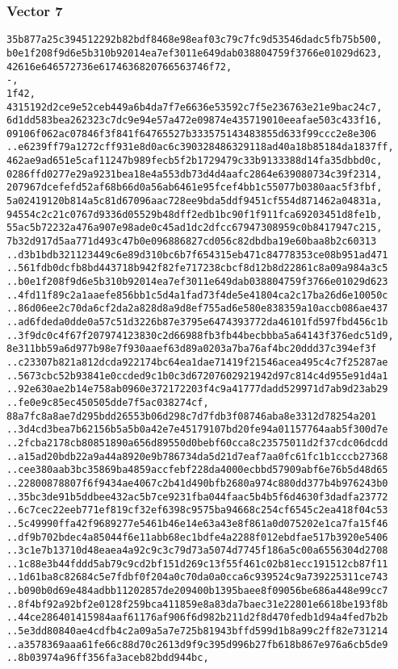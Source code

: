 \documentclass[
]{article}
\begin{document}
\hypertarget{vector-7-2}{%
\subsubsection{Vector 7}\label{vector-7-2}}

\begin{verbatim}
35b877a25c394512292b82bdf8468e98eaf03c79c7fc9d53546dadc5fb75b500,
b0e1f208f9d6e5b310b92014ea7ef3011e649dab038804759f3766e01029d623,
42616e646572736e6174636820766563746f72,
-,
1f42,
4315192d2ce9e52ceb449a6b4da7f7e6636e53592c7f5e236763e21e9bac24c7,
6d1dd583bea262323c7dc9e94e57a472e09874e435719010eeafae503c433f16,
09106f062ac07846f3f841f64765527b333575143483855d633f99ccc2e8e306
..e6239ff79a1272cff931e8d0ac6c390328486329118ad40a18b85184da1837ff,
462ae9ad651e5caf11247b989fecb5f2b1729479c33b9133388d14fa35dbbd0c,
0286ffd0277e29a9231bea18e4a553db73d4d4aafc2864e639080734c39f2314,
207967dcefefd52af68b66d0a56ab6461e95fcef4bb1c55077b0380aac5f3fbf,
5a02419120b814a5c81d67096aac728ee9bda5ddf9451cf554d871462a04831a,
94554c2c21c0767d9336d05529b48dff2edb1bc90f1f911fca69203451d8fe1b,
55ac5b72232a476a907e98ade0c45ad1dc2dfcc67947308959c0b8417947c215,
7b32d917d5aa771d493c47b0e096886827cd056c82dbdba19e60baa8b2c60313
..d3b1bdb321123449c6e89d310bc6b7f654315eb471c84778353ce08b951ad471
..561fdb0dcfb8bd443718b942f82fe717238cbcf8d12b8d22861c8a09a984a3c5
..b0e1f208f9d6e5b310b92014ea7ef3011e649dab038804759f3766e01029d623
..4fd11f89c2a1aaefe856bb1c5d4a1fad73f4de5e41804ca2c17ba26d6e10050c
..86d06ee2c70da6cf2da2a828d8a9d8ef755ad6e580e838359a10accb086ae437
..ad6fdeda0dde0a57c51d3226b87e3795e6474393772da46101fd597fbd456c1b
..3f9dc0c4f67f207974123830c2d66988fb3fb44becbbba5a64143f376edc51d9,
8e311bb59a6d977b98e7f930aaef63d89a0203a7ba76af4bc20ddd37c394ef3f
..c23307b821a812dcda922174bc64ea1dae71419f21546acea495c4c7f25287ae
..5673cbc52b93841e0ccded9c1b0c3d67207602921942d97c814c4d955e91d4a1
..92e630ae2b14e758ab0960e372172203f4c9a41777dadd529971d7ab9d23ab29
..fe0e9c85ec450505dde7f5ac038274cf,
88a7fc8a8ae7d295bdd26553b06d298c7d7fdb3f08746aba8e3312d78254a201
..3d4cd3bea7b62156b5a5b0a42e7e45179107bd20fe94a01157764aab5f300d7e
..2fcba2178cb80851890a656d89550d0bebf60cca8c23575011d2f37cdc06dcdd
..a15ad20bdb22a9a44a8920e9b786734da5d21d7eaf7aa0fc61fc1b1cccb27368
..cee380aab3bc35869ba4859accfebf228da4000ecbbd57909abf6e76b5d48d65
..22800878807f6f9434ae4067c2b41d490bfb2680a974c880dd377b4b976243b0
..35bc3de91b5ddbee432ac5b7ce9231fba044faac5b4b5f6d4630f3dadfa23772
..6c7cec22eeb771ef819cf32ef6398c9575ba94668c254cf6545c2ea418f04c53
..5c49990ffa42f9689277e5461b46e14e63a43e8f861a0d075202e1ca7fa15f46
..df9b702bdec4a85044f6e11abb68ec1bdfe4a2288f012ebdfae517b3920e5406
..3c1e7b13710d48eaea4a92c9c3c79d73a5074d7745f186a5c00a6556304d2708
..1c88e3b44fddd5ab79c9cd2bf151d269c13f55f461c02b81ecc191512cb87f11
..1d61ba8c82684c5e7fdbf0f204a0c70da0a0cca6c939524c9a739225311ce743
..b090b0d69e484adbb11202857de209400b1395baee8f09056be686a448e99cc7
..8f4bf92a92bf2e0128f259bca411859e8a83da7baec31e22801e6618be193f8b
..44ce286401415984aaf61176af906f6d982b211d2f8d470fedb1d94a4fed7b2b
..5e3dd80840ae4cdfb4c2a09a5a7e725b81943bffd599d1b8a99c2ff82e731214
..a3578369aaa61fe66c88d70c2613d9f9c395d996b27fb618b867e976a6cb5de9
..8b03974a96ff356fa3aceb82bdd944bc,
\end{verbatim}
\end{document}
